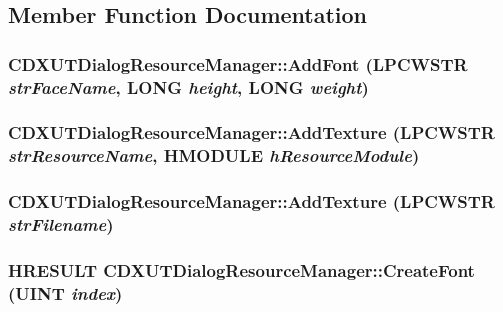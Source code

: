 \subsection{Member Function Documentation}
\hypertarget{class_c_d_x_u_t_dialog_resource_manager_a469b81ccbb955b2841ba72d183761a08}{
\subsubsection[{AddFont}]{ CDXUTDialogResourceManager::AddFont (LPCWSTR {\em strFaceName}, \/  LONG {\em height}, \/  LONG {\em weight})}}
\label{class_c_d_x_u_t_dialog_resource_manager_a469b81ccbb955b2841ba72d183761a08}
\hypertarget{class_c_d_x_u_t_dialog_resource_manager_a3f9d7c4c960b1e30a52f900283afa786}{
\subsubsection[{AddTexture}]{ CDXUTDialogResourceManager::AddTexture (LPCWSTR {\em strResourceName}, \/  HMODULE {\em hResourceModule})}}
\label{class_c_d_x_u_t_dialog_resource_manager_a3f9d7c4c960b1e30a52f900283afa786}
\hypertarget{class_c_d_x_u_t_dialog_resource_manager_af5c09862641c351edb3753a36a87c79a}{
\subsubsection[{AddTexture}]{ CDXUTDialogResourceManager::AddTexture (LPCWSTR {\em strFilename})}}
\label{class_c_d_x_u_t_dialog_resource_manager_af5c09862641c351edb3753a36a87c79a}
\hypertarget{class_c_d_x_u_t_dialog_resource_manager_afd9720b2dfdd96e4a4434cefe4216af0}{
\subsubsection[{CreateFont}]{\setlength{\rightskip}{0pt plus 5cm}HRESULT CDXUTDialogResourceManager::CreateFont (UINT {\em index})}}
